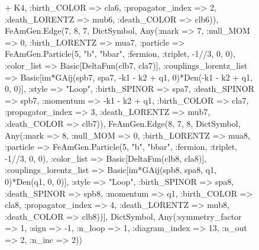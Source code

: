 \documentclass{revtex4}
\begin{document}
\begin{figure}[!htb]
\begin{center}
{+ K4, :birth_COLOR => cla6, :propagator_index => 2, :death_LORENTZ => mub6, :death_COLOR => clb6)), FeAmGen.Edge(7, 8, 7, Dict{Symbol, Any}(:mark => 7, :null_MOM => 0, :birth_LORENTZ => mua7, :particle => FeAmGen.Particle(5, "b", "bbar", :fermion, :triplet, -1//3, 0, 0), :color_list => Basic[DeltaFun(clb7, cla7)], :couplings_lorentz_list => Basic[im*GAij(spb7, spa7, -k1 - k2 + q1, 0)*Den(-k1 - k2 + q1, 0, 0)], :style => "Loop", :birth_SPINOR => spa7, :death_SPINOR => spb7, :momentum => -k1 - k2 + q1, :birth_COLOR => cla7, :propagator_index => 3, :death_LORENTZ => mub7, :death_COLOR => clb7)), FeAmGen.Edge(8, 7, 8, Dict{Symbol, Any}(:mark => 8, :null_MOM => 0, :birth_LORENTZ => mua8, :particle => FeAmGen.Particle(5, "b", "bbar", :fermion, :triplet, -1//3, 0, 0), :color_list => Basic[DeltaFun(clb8, cla8)], :couplings_lorentz_list => Basic[im*GAij(spb8, spa8, q1, 0)*Den(q1, 0, 0)], :style => "Loop", :birth_SPINOR => spa8, :death_SPINOR => spb8, :momentum => q1, :birth_COLOR => cla8, :propagator_index => 4, :death_LORENTZ => mub8, :death_COLOR => clb8))], Dict{Symbol, Any}(:symmetry_factor => 1, :sign => -1, :n_loop => 1, :diagram_index => 13, :n_out => 2, :n_inc => 2)) 
}
\end{center}
\end{figure}
\end{document}
